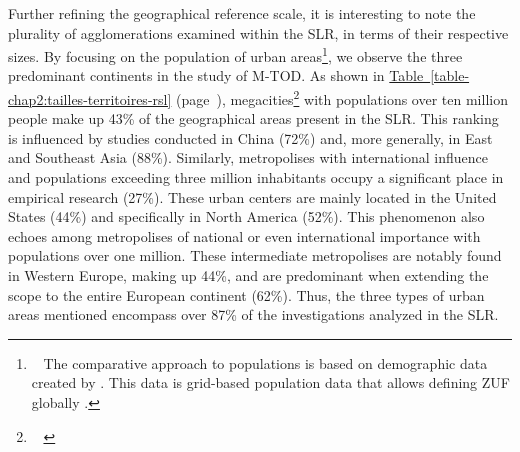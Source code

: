 \begin{refsegment}
Further refining the geographical reference scale, it is interesting to note the plurality of agglomerations examined within the \acrshort{SLR}, in terms of their respective sizes. By focusing on the population of urban areas\footnote{~
    The comparative approach to populations is based on demographic data created by \textcolor{blue}{\textcite[]{schiavina_ghs-fua_2019}}. This data is grid-based population data that allows defining \acrfull{ZUF} globally \textcolor{blue}{\autocite[3]{moreno-monroy_metropolitan_2021}}.
}, we observe the three predominant continents in the study of \acrshort{M-TOD}. As shown in \hyperref[table-chap2:tailles-territoires-rsl]{Table~\ref{table-chap2:tailles-territoires-rsl}} (page~\pageref{table-chap2:tailles-territoires-rsl}), megacities\footnote{~
     \textcolor{blue}{\autocite[]{geoconfluences_megapole_2023}}
} with populations over ten million people make up 43\% of the geographical areas present in the \acrshort{SLR}. This ranking is influenced by studies conducted in China (72\%) and, more generally, in East and Southeast Asia (88\%). Similarly, metropolises with international influence and populations exceeding three million inhabitants occupy a significant place in empirical research (27\%). These urban centers are mainly located in the United States (44\%) and specifically in North America (52\%). This phenomenon also echoes among metropolises of national or even international importance with populations over one million. These intermediate metropolises are notably found in Western Europe, making up 44\%, and are predominant when extending the scope to the entire European continent (62\%). Thus, the three types of urban areas mentioned encompass over 87\% of the investigations analyzed in the \acrshort{SLR}.%



\end{refsegment}

